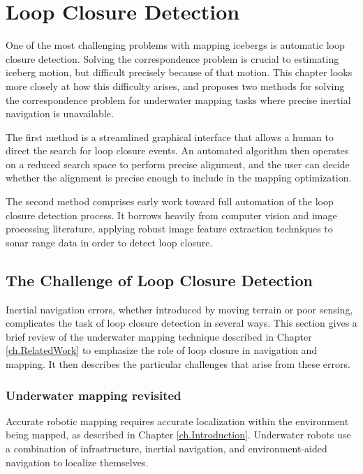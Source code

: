 
\chapter{Loop Closure Detection}
\label{ch.LoopClosure}

One of the most challenging problems with mapping icebergs is automatic loop closure detection. Solving the correspondence problem is crucial to estimating iceberg motion, but difficult precisely because of that motion. This chapter looks more closely at how this difficulty arises, and proposes two methods for solving the correspondence problem for underwater mapping tasks where precise inertial navigation is unavailable. 

The first method is a streamlined graphical interface that allows a human to direct the search for loop closure events. An automated algorithm then operates on a reduced search space to perform precise alignment, and the user can decide whether the alignment is precise enough to include in the mapping optimization.

The second method comprises early work toward full automation of the loop closure detection process. It borrows heavily from computer vision and image processing literature, applying robust image feature extraction techniques to sonar range data in order to detect loop closure. 

\section{The Challenge of Loop Closure Detection}

Inertial navigation errors, whether introduced by moving terrain or poor sensing, complicates the task of loop closure detection in several ways. This section gives a brief review of the underwater mapping technique described in Chapter \ref{ch.RelatedWork} to emphasize the role of loop closure in navigation and mapping. It then describes the particular challenges that arise from these errors.

\subsection{Underwater mapping revisited}

Accurate robotic mapping requires accurate localization within the environment being mapped, as described in Chapter \ref{ch.Introduction}. Underwater robots use a combination of infrastructure, inertial navigation, and environment-aided navigation to localize themselves. 

